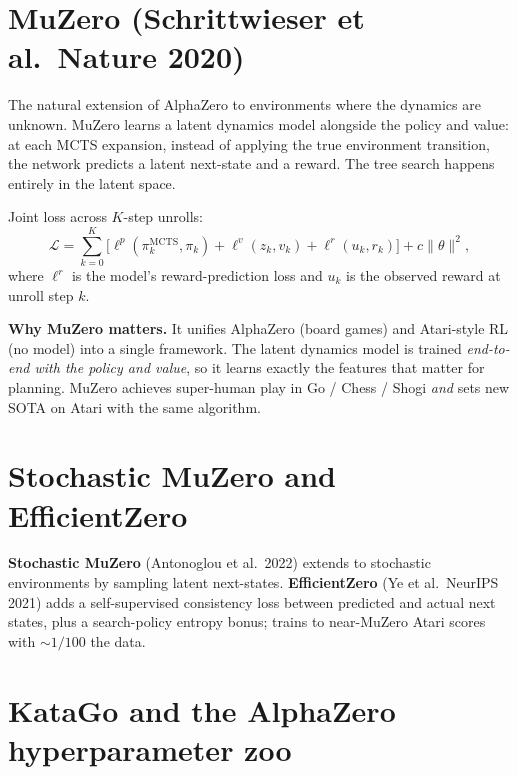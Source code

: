 \documentclass[11pt,oneside]{scrbook}
\begin{document}
\section{MuZero (Schrittwieser et al.\ Nature 2020)}

The natural extension of AlphaZero to environments where the dynamics are
unknown. MuZero learns a latent dynamics model alongside the policy and
value: at each MCTS expansion, instead of applying the true environment
transition, the network predicts a latent next-state and a reward. The
tree search happens entirely in the latent space.

\begin{theorem}
Joint loss across $K$-step unrolls:
\[
\mathcal{L} = \sum_{k=0}^K \big[\ell^p(\pi_k^{\mathrm{MCTS}}, \pi_k) + \ell^v(z_k, v_k) + \ell^r(u_k, r_k)\big] + c \|\theta\|^2,
\]
where $\ell^r$ is the model's reward-prediction loss and $u_k$ is the
observed reward at unroll step $k$.
\end{theorem}

\textbf{Why MuZero matters.} It unifies AlphaZero (board games) and
Atari-style RL (no model) into a single framework. The latent dynamics
model is trained \emph{end-to-end with the policy and value}, so it learns
exactly the features that matter for planning. MuZero achieves
super-human play in Go / Chess / Shogi \emph{and} sets new SOTA on Atari
with the same algorithm.

\section{Stochastic MuZero and EfficientZero}

\textbf{Stochastic MuZero} (Antonoglou et al.\ 2022) extends to stochastic
environments by sampling latent next-states. \textbf{EfficientZero}
(Ye et al.\ NeurIPS 2021) adds a self-supervised consistency loss between
predicted and actual next states, plus a search-policy entropy bonus;
trains to near-MuZero Atari scores with $\sim 1/100$ the data.

\section{KataGo and the AlphaZero hyperparameter zoo}
\end{document}
